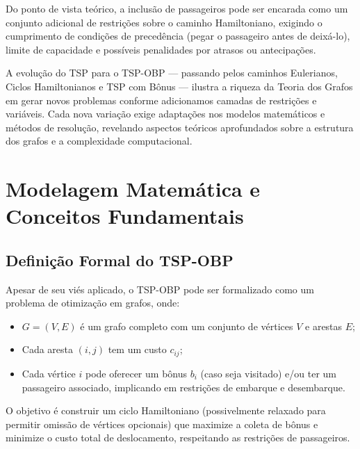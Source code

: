 \documentclass[12pt, a4paper]{report}
\begin{document}
Do ponto de vista teórico, a inclusão de passageiros pode ser encarada como um conjunto adicional de restrições sobre o caminho Hamiltoniano, exigindo o cumprimento de condições de precedência (pegar o passageiro antes de deixá-lo), limite de capacidade e possíveis penalidades por atrasos ou antecipações. 

A evolução do TSP para o TSP-OBP — passando pelos caminhos Eulerianos, Ciclos Hamiltonianos e TSP com Bônus — ilustra a riqueza da Teoria dos Grafos em gerar novos problemas conforme adicionamos camadas de restrições e variáveis. Cada nova variação exige adaptações nos modelos matemáticos e métodos de resolução, revelando aspectos teóricos aprofundados sobre a estrutura dos grafos e a complexidade computacional.

\chapter{Modelagem Matemática e Conceitos Fundamentais}

\section{Definição Formal do TSP-OBP}
Apesar de seu viés aplicado, o TSP-OBP pode ser formalizado como um problema de otimização em grafos, onde:
\begin{itemize}
    \item $G = (V, E)$ é um grafo completo com um conjunto de vértices $V$ e arestas $E$;
    \item Cada aresta $(i,j)$ tem um custo $c_{ij}$;
    \item Cada vértice $i$ pode oferecer um bônus $b_i$ (caso seja visitado) e/ou ter um passageiro associado, implicando em restrições de embarque e desembarque.
\end{itemize}

O objetivo é construir um ciclo Hamiltoniano (possivelmente relaxado para permitir omissão de vértices opcionais) que maximize a coleta de bônus e minimize o custo total de deslocamento, respeitando as restrições de passageiros.
\end{document}
